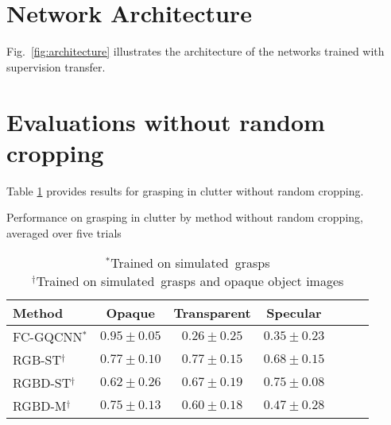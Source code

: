% 
\begin{appendices}




\section{Network Architecture}
\label{appendix:architecture}

Fig.~\ref{fig:architecture} illustrates the architecture of the networks trained with supervision transfer.

\section{Evaluations without random cropping}
\label{appendix:nocrop}

Table \ref{table:clutter_eval_nocrop} provides results for grasping in clutter without random cropping.  

\begin{table}[h]
    \centering
    \caption{Performance on grasping in clutter by method without random cropping, averaged over five trials}
    \label{table:clutter_eval_nocrop}
    \begin{tabular}{l cc cc cc}
      \toprule
        Method 
            & Opaque
            & Transparent
            & Specular \\
        \midrule
        \vspace{0.6em}
        FC-GQCNN$^*$
            & $0.95\pm0.05$
            & $0.26\pm0.25$
            & $0.35\pm0.23$ \\
        RGB-ST$^\dagger$
            & $0.77\pm0.10$
            & $0.77\pm0.15$
            & $0.68\pm0.15$ \\
        RGBD-ST$^\dagger$
            & $0.62\pm0.26$
            & $0.67\pm0.19$
            & $0.75\pm0.08$ \\
        RGBD-M$^\dagger$ 
            & $0.75\pm0.13$
            & $0.60\pm0.18$
            & $0.47\pm0.28$ \\
      \bottomrule
    \end{tabular}
    \vspace{\baselineskip}
    \caption*{\footnotesize $^*$Trained on simulated\ grasps \\ $^\dagger$Trained on simulated\ grasps and opaque object images \\}
    \vspace{-1em}
\end{table}


\end{appendices}
